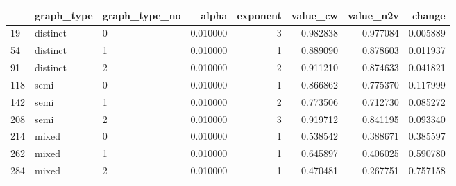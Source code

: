 \begin{tabular}{lllrrrrr}
\toprule
 & graph_type & graph_type_no & alpha & exponent & value_cw & value_n2v & change \\
\midrule
19 & distinct & 0 & 0.010000 & 3 & 0.982838 & 0.977084 & 0.005889 \\
54 & distinct & 1 & 0.010000 & 1 & 0.889090 & 0.878603 & 0.011937 \\
91 & distinct & 2 & 0.010000 & 2 & 0.911210 & 0.874633 & 0.041821 \\
118 & semi & 0 & 0.010000 & 1 & 0.866862 & 0.775370 & 0.117999 \\
142 & semi & 1 & 0.010000 & 2 & 0.773506 & 0.712730 & 0.085272 \\
208 & semi & 2 & 0.010000 & 3 & 0.919712 & 0.841195 & 0.093340 \\
214 & mixed & 0 & 0.010000 & 1 & 0.538542 & 0.388671 & 0.385597 \\
262 & mixed & 1 & 0.010000 & 1 & 0.645897 & 0.406025 & 0.590780 \\
284 & mixed & 2 & 0.010000 & 1 & 0.470481 & 0.267751 & 0.757158 \\
\bottomrule
\end{tabular}
